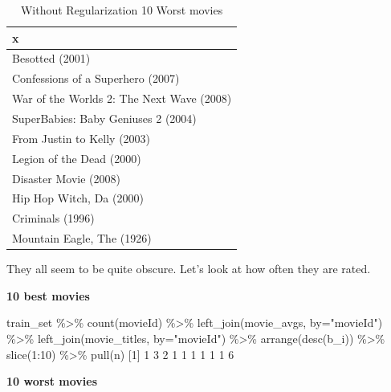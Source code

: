 \documentclass[
]{article}
\newenvironment{Shaded}{}{}
\newcommand{\AttributeTok}[1]{\textcolor[rgb]{0.49,0.56,0.16}{#1}}
\newcommand{\DecValTok}[1]{\textcolor[rgb]{0.25,0.63,0.44}{#1}}
\newcommand{\FunctionTok}[1]{\textcolor[rgb]{0.02,0.16,0.49}{#1}}
\newcommand{\NormalTok}[1]{#1}
\newcommand{\SpecialCharTok}[1]{\textcolor[rgb]{0.25,0.44,0.63}{#1}}
\newcommand{\StringTok}[1]{\textcolor[rgb]{0.25,0.44,0.63}{#1}}
\begin{document}
\begin{table}[H]

\caption{\label{tab:reg_4}Without Regularization 10 Worst movies\label{tbl:without_regularization_10_worst_movies}}
\centering
\begin{tabular}[t]{l}
\toprule
x\\
\midrule
Besotted (2001)\\
Confessions of a Superhero (2007)\\
War of the Worlds 2: The Next Wave (2008)\\
SuperBabies: Baby Geniuses 2 (2004)\\
From Justin to Kelly (2003)\\
Legion of the Dead (2000)\\
Disaster Movie (2008)\\
Hip Hop Witch, Da (2000)\\
Criminals (1996)\\
Mountain Eagle, The (1926)\\
\bottomrule
\end{tabular}
\end{table}

They all seem to be quite obscure. Let's look at how often they are
rated.

\textbf{10 best movies}

\begin{Shaded}
\begin{Highlighting}[]
\NormalTok{train\_set }\SpecialCharTok{\%\textgreater{}\%} \FunctionTok{count}\NormalTok{(movieId) }\SpecialCharTok{\%\textgreater{}\%} 
  \FunctionTok{left\_join}\NormalTok{(movie\_avgs, }\AttributeTok{by=}\StringTok{"movieId"}\NormalTok{) }\SpecialCharTok{\%\textgreater{}\%}
  \FunctionTok{left\_join}\NormalTok{(movie\_titles, }\AttributeTok{by=}\StringTok{"movieId"}\NormalTok{) }\SpecialCharTok{\%\textgreater{}\%}
  \FunctionTok{arrange}\NormalTok{(}\FunctionTok{desc}\NormalTok{(b\_i)) }\SpecialCharTok{\%\textgreater{}\%} 
  \FunctionTok{slice}\NormalTok{(}\DecValTok{1}\SpecialCharTok{:}\DecValTok{10}\NormalTok{) }\SpecialCharTok{\%\textgreater{}\%} 
  \FunctionTok{pull}\NormalTok{(n)}
\NormalTok{ [}\DecValTok{1}\NormalTok{] }\DecValTok{1} \DecValTok{3} \DecValTok{2} \DecValTok{1} \DecValTok{1} \DecValTok{1} \DecValTok{1} \DecValTok{1} \DecValTok{1} \DecValTok{6}
\end{Highlighting}
\end{Shaded}

\textbf{10 worst movies}
\end{document}
